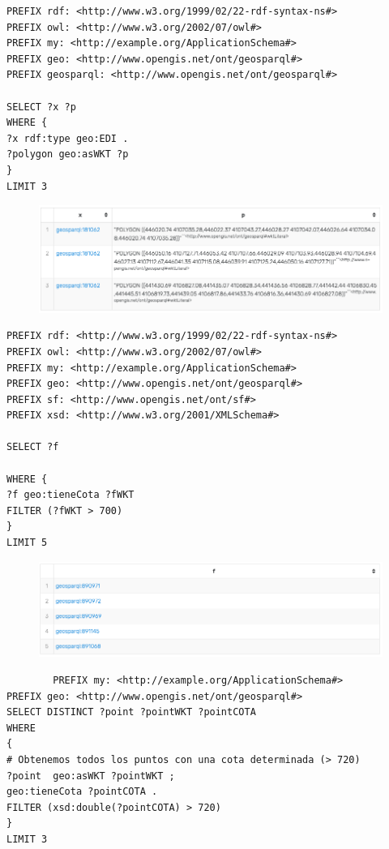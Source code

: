 \begin{lstlisting}
PREFIX rdf: <http://www.w3.org/1999/02/22-rdf-syntax-ns#>
PREFIX owl: <http://www.w3.org/2002/07/owl#>
PREFIX my: <http://example.org/ApplicationSchema#>
PREFIX geo: <http://www.opengis.net/ont/geosparql#>
PREFIX geosparql: <http://www.opengis.net/ont/geosparql#>

SELECT ?x ?p
WHERE {
?x rdf:type geo:EDI .
?polygon geo:asWKT ?p
}
LIMIT 3
\end{lstlisting}

\begin{figure}[H]
	\centering
	\includegraphics[width=0.7\linewidth]{imagenes/capitulo4/salida3}
	\caption{}
	\label{fig:salida3}
\end{figure}



\begin{lstlisting}
PREFIX rdf: <http://www.w3.org/1999/02/22-rdf-syntax-ns#>
PREFIX owl: <http://www.w3.org/2002/07/owl#>
PREFIX my: <http://example.org/ApplicationSchema#>
PREFIX geo: <http://www.opengis.net/ont/geosparql#>
PREFIX sf: <http://www.opengis.net/ont/sf#>
PREFIX xsd: <http://www.w3.org/2001/XMLSchema#>

SELECT ?f

WHERE {
?f geo:tieneCota ?fWKT
FILTER (?fWKT > 700)
}
LIMIT 5
\end{lstlisting}


\begin{figure}[H]
	\centering
	\includegraphics[width=0.7\linewidth]{imagenes/capitulo4/salida4}
	\caption{}
	\label{fig:salida4}
\end{figure}


\begin{lstlisting}
        PREFIX my: <http://example.org/ApplicationSchema#>
PREFIX geo: <http://www.opengis.net/ont/geosparql#>
SELECT DISTINCT ?point ?pointWKT ?pointCOTA
WHERE 
{
# Obtenemos todos los puntos con una cota determinada (> 720)
?point 	geo:asWKT ?pointWKT ;
geo:tieneCota ?pointCOTA .
FILTER (xsd:double(?pointCOTA) > 720)
}
LIMIT 3
\end{lstlisting}



